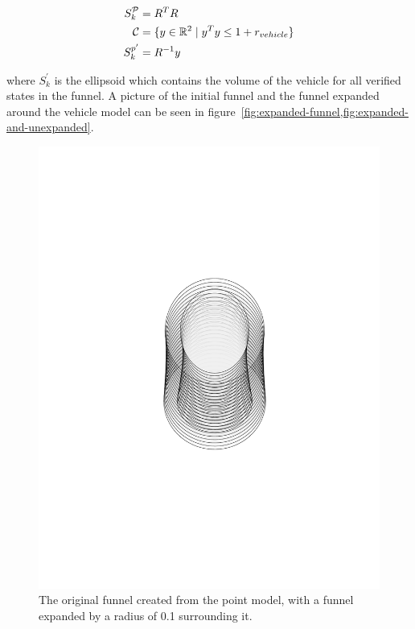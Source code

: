 \begin{align*}
  S_{k}^{\mathcal{P}} &= R^{T}R \\
  \mathcal{C} &= \lbrace y \in \mathbb{R}^2 \mid y^{T}y \leq 1 + r_{vehicle}\rbrace \\
  S_{k}^{p'} &= R^{-1}y \\
\end{align*}

where \(S_{k}^{'}\) is the ellipsoid which contains the volume of the vehicle
for all verified states in the funnel. A picture of the initial funnel and the
funnel expanded around the vehicle model can be seen in
figure~\cref{fig:expanded-funnel,fig:expanded-and-unexpanded}.

\begin{figure}
  \centering \includegraphics[clip, trim=6cm 8cm 6cm 8cm,
  scale=.5]{figures/method/expanded-funnel}
  \caption{The original funnel created from the point model, with a funnel
    expanded by a radius of 0.1 surrounding it.}
  \label{fig:expanded-funnel}
\end{figure}

